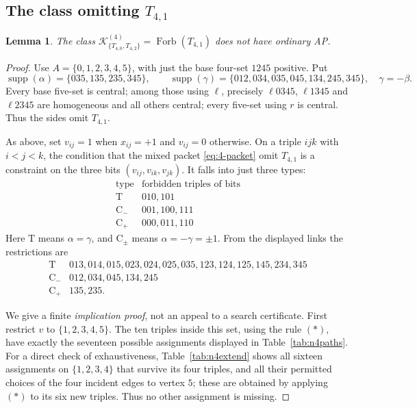 \documentclass[11pt,a4paper]{article}
\newtheorem{lemma}[theorem]{Lemma}
\theoremstyle{remark}
\newcommand{\K}{\mathcal K}
\newcommand{\Forb}{\operatorname{Forb}}
\newcommand{\supp}{\operatorname{supp}}
\begin{document}
\subsection{The class omitting $T_{4,1}$}
\begin{lemma}\label{lem:4-forb}
The class $\K^{(4)}_{\{T_{4,0},T_{4,2}\}}=\Forb(T_{4,1})$
does not have ordinary AP.
\end{lemma}
\begin{proof}
Use $A=\{0,1,2,3,4,5\}$, with just the base four-set $1245$
positive.  Put
\[
 \supp(\alpha)=\{035,135,235,345\},\qquad
 \supp(\gamma)=\{012,034,035,045,134,245,345\},\quad
 \gamma=-\beta.
\]
Every base five-set is central; among those using $\ell$, precisely
$\ell0345$, $\ell1345$ and $\ell2345$ are homogeneous and all others
central; every five-set using $r$ is central.  Thus the sides omit
$T_{4,1}$.

As above, set $v_{ij}=1$ when $x_{ij}=+1$ and $v_{ij}=0$ otherwise.
On a triple $ijk$ with $i<j<k$, the condition that the mixed packet
\eqref{eq:4-packet} omit $T_{4,1}$ is a constraint on the three bits
$(v_{ij},v_{ik},v_{jk})$.  It falls into just three types:
\[
\begin{array}{c|l}
 \text{type}&\text{forbidden triples of bits}\\\hline
 \mathrm T&010,101\\
 \mathrm C_-&001,100,111\\
 \mathrm C_+&000,011,110
\end{array}
\]
Here $\mathrm T$ means $\alpha=\gamma$, and $\mathrm C_\pm$
means $\alpha=-\gamma=\pm1$.  From the displayed links the
restrictions are
\[
\begin{array}{r|l}
 \mathrm T&013,014,015,023,024,025,035,123,124,125,145,234,345\\
 \mathrm C_-&012,034,045,134,245\\
 \mathrm C_+&135,235.
\end{array}\tag{*}
\]

We give a finite \emph{implication proof}, not an appeal to a search
certificate.  First restrict $v$ to $\{1,2,3,4,5\}$.  The ten
triples inside this set, using the rule $(*)$, have exactly the
seventeen possible assignments displayed in Table~\ref{tab:n4paths}.
For a direct check of exhaustiveness, Table~\ref{tab:n4extend}
shows all sixteen assignments on $\{1,2,3,4\}$ that survive its
four triples, and all their permitted choices of the four incident
edges to vertex $5$; these are obtained by applying $(*)$ to its
six new triples.  Thus no other assignment is missing.


\end{proof}
\end{document}
